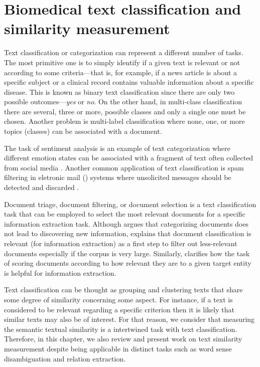 \chapter{Biomedical text classification and similarity measurement}
\label{c4}

Text classification or categorization can represent a different number of tasks.
The most primitive one is to simply identify if a given text is relevant or not according to some criteria---that is, for example, if a news article is about a specific subject or a clinical record contains valuable information about a specific disease.
This is known as binary text classification since there are only two possible outcomes---\textit{yes} or \textit{no}.
On the other hand, in multi-class classification there are several, three or more, possible classes and only a single one must be chosen.
Another problem is multi-label classification where none, one, or more topics (classes) can be associated with a document.

The  task of sentiment analysis is an example of text categorization where different emotion states can be associated with a fragment of text often collected from social media \parencite{feldman2013a,liu2015d,bouazizi2016a,tao2020a}.
Another common application of text classification is spam filtering in eletronic mail () systems where unsolicited  messages should be detected and discarded \parencite{diao2000a,zhang2004a,bhowmick2018a}.

Document triage, document filtering, or document selection is a text classification task that can be employed to select the most relevant documents for a specific information extraction task.
Although \textcite{hearst1999a} argues that categorizing documents does not lead to discovering new information, \textcite{sarawagi2008a} explains that document classification is relevant (for information extraction) as a first step to filter out less-relevant documents especially if the corpus is very large.
Similarly, \textcite{balog2018a} clarifies how the task of scoring documents according to how relevant they are to a given target entity is helpful for information extraction.

Text classification can be thought as grouping and clustering texts that share some degree of similarity concerning some aspect.
For instance, if a text is considered to be relevant regarding a specific criterion then it is likely that similar texts may also be of interest.
For that reason, we consider that measuring the semantic textual similarity is a intertwined task with text classification.
Therefore, in this chapter, we also review and present work on text similarity measurement despite being applicable in distinct  tasks such as word sense disambiguation and relation extraction.

